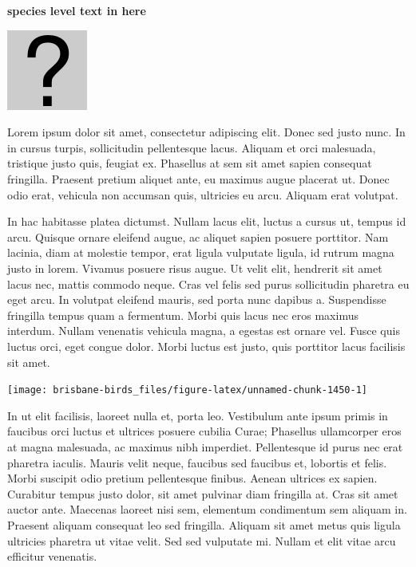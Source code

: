 \documentclass[]{book}
\let\origfigure\figure
\let\endorigfigure\endfigure
\renewenvironment{figure}[1][2] {
  \expandafter\origfigure\expandafter[H]
} {
  \endorigfigure
}
\begin{document}
\textbf{species level text in here}

\begin{figure}
\centering
\includegraphics{assets/missing.png}
\caption{No image for species}
\end{figure}

Lorem ipsum dolor sit amet, consectetur adipiscing elit. Donec sed justo
nunc. In in cursus turpis, sollicitudin pellentesque lacus. Aliquam et
orci malesuada, tristique justo quis, feugiat ex. Phasellus at sem sit
amet sapien consequat fringilla. Praesent pretium aliquet ante, eu
maximus augue placerat ut. Donec odio erat, vehicula non accumsan quis,
ultricies eu arcu. Aliquam erat volutpat.

In hac habitasse platea dictumst. Nullam lacus elit, luctus a cursus ut,
tempus id arcu. Quisque ornare eleifend augue, ac aliquet sapien posuere
porttitor. Nam lacinia, diam at molestie tempor, erat ligula vulputate
ligula, id rutrum magna justo in lorem. Vivamus posuere risus augue. Ut
velit elit, hendrerit sit amet lacus nec, mattis commodo neque. Cras vel
felis sed purus sollicitudin pharetra eu eget arcu. In volutpat eleifend
mauris, sed porta nunc dapibus a. Suspendisse fringilla tempus quam a
fermentum. Morbi quis lacus nec eros maximus interdum. Nullam venenatis
vehicula magna, a egestas est ornare vel. Fusce quis luctus orci, eget
congue dolor. Morbi luctus est justo, quis porttitor lacus facilisis sit
amet.

\begin{figure}
\texttt{[image: brisbane-birds\_files/figure-latex/unnamed-chunk-1450-1]} \caption{insert figure caption}\label{fig:unnamed-chunk-1450}
\end{figure}

In ut elit facilisis, laoreet nulla et, porta leo. Vestibulum ante ipsum
primis in faucibus orci luctus et ultrices posuere cubilia Curae;
Phasellus ullamcorper eros at magna malesuada, ac maximus nibh
imperdiet. Pellentesque id purus nec erat pharetra iaculis. Mauris velit
neque, faucibus sed faucibus et, lobortis et felis. Morbi suscipit odio
pretium pellentesque finibus. Aenean ultrices ex sapien. Curabitur
tempus justo dolor, sit amet pulvinar diam fringilla at. Cras sit amet
auctor ante. Maecenas laoreet nisi sem, elementum condimentum sem
aliquam in. Praesent aliquam consequat leo sed fringilla. Aliquam sit
amet metus quis ligula ultricies pharetra ut vitae velit. Sed sed
vulputate mi. Nullam et elit vitae arcu efficitur venenatis.
\end{document}
